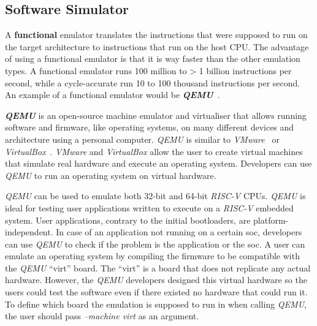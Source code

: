 \subsection{Software Simulator}

A \textbf{functional} emulator translates the instructions that were supposed to run on the target architecture to instructions that run on the host CPU. The advantage of using a functional emulator is that it is way faster than the other emulation types. A functional emulator runs 100 million to > 1 billion instructions per second, while a cycle-accurate run 10 to 100 thousand instructions per second. An example of a functional emulator would be \textbf{\textit{QEMU}}~\cite{bellard2005qemu}.

\textbf{\textit{QEMU}} is an open-source machine emulator and virtualiser that allows running software and firmware, like operating systems, on many different devices and architecture using a personal computer. \textit{QEMU} is similar to \textit{VMware}~\cite{bugnion2012bringing} or \textit{VirtualBox}~\cite{oracle2015virtualbox}. \textit{VMware} and \textit{VirtualBox} allow the user to create virtual machines that simulate real hardware and execute an operating system. Developers can use \textit{QEMU} to run an operating system on virtual hardware.

\textit{QEMU} can be used to emulate both 32-bit and 64-bit \textit{RISC-V} CPUs. \textit{QEMU} is ideal for testing user applications written to execute on a \textit{RISC-V} embedded system. User applications, contrary to the initial bootloaders, are platform-independent. In case of an application not running on a certain \acrshort{soc}, developers can use \textit{QEMU} to check if the problem is the application or the \acrshort{soc}. A user can emulate an operating system by compiling the firmware to be compatible with the \textit{QEMU} \enquote{virt} board. The \enquote{virt} is a board that does not replicate any actual hardware. However, the \textit{QEMU} developers designed this virtual hardware so the users could test the software even if there existed no hardware that could run it. To define which board the emulation is supposed to run in when calling \textit{QEMU}, the user should pass \textit{--machine virt} as an argument.
